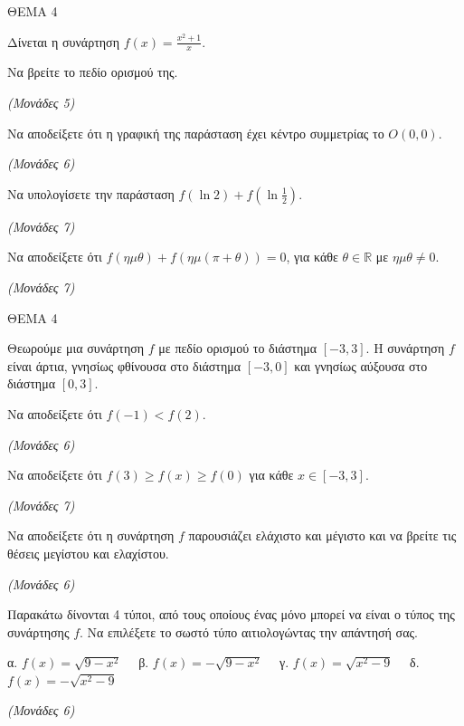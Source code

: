 \documentclass[11pt,a4paper,twoside]{book}
\newcommand{\monades}[1]{\hfill \textit{(Μονάδες #1)}}
\begin{document}
\vspace{4mm}

ΘΕΜΑ 4

Δίνεται η συνάρτηση $f(x) = \frac{x^2 + 1}{x}$.

\begin{alist}
\item Να βρείτε το πεδίο ορισμού της.

\monades{5}

\item Να αποδείξετε ότι η γραφική της παράσταση έχει κέντρο συμμετρίας το $O(0,0)$.

\monades{6}

\item Να υπολογίσετε την παράσταση $f(\ln 2) + f\left(\ln \frac{1}{2}\right)$.

\monades{7}

\item Να αποδείξετε ότι $f(\eta\mu\theta) + f(\eta\mu(\pi + \theta)) = 0$, για κάθε $\theta \in \mathbb{R}$ με $\eta\mu\theta \neq 0$.

\monades{7}
\end{alist}

\vspace{4mm}

ΘΕΜΑ 4

Θεωρούμε μια συνάρτηση $f$ με πεδίο ορισμού το διάστημα $[-3, 3]$. Η συνάρτηση $f$ είναι άρτια, γνησίως φθίνουσα στο διάστημα $[-3, 0]$ και γνησίως αύξουσα στο διάστημα $[0, 3]$.

\begin{alist}
\item Να αποδείξετε ότι $f(-1) < f(2)$.

\monades{6}

\item Να αποδείξετε ότι $f(3) \ge f(x) \ge f(0)$ για κάθε $x \in [-3, 3]$.

\monades{7}

\item Να αποδείξετε ότι η συνάρτηση $f$ παρουσιάζει ελάχιστο και μέγιστο και να βρείτε τις θέσεις μεγίστου και ελαχίστου.

\monades{6}

\item Παρακάτω δίνονται 4 τύποι, από τους οποίους ένας μόνο μπορεί να είναι ο τύπος της συνάρτησης $f$. Να επιλέξετε το σωστό τύπο αιτιολογώντας την απάντησή σας.

α. $f(x) = \sqrt{9 - x^2} \quad$ β. $f(x) = -\sqrt{9 - x^2} \quad$ γ. $f(x) = \sqrt{x^2 - 9} \quad$ δ. $f(x) = -\sqrt{x^2 - 9}$

\monades{6}
\end{alist}
\end{document}
